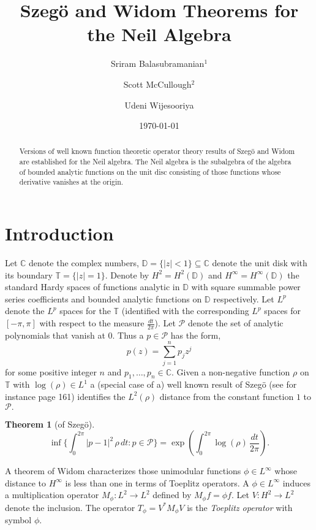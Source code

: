 \documentclass[12pt]{amsart}
\title[The Neil Algebra]{Szeg\"o and Widom Theorems for the Neil Algebra}
\author[S. Balasubramanian]{Sriram Balasubramanian${}^1$}
\author[S. McCullough]{Scott McCullough${}^2$}
\author[U. Wijesooriya]{Udeni Wijesooriya}
\date{\today}
\newtheorem{theorem}{Theorem}[section]
\theoremstyle{definition}
\theoremstyle{remark}
\numberwithin{equation}{section}
\begin{document}
\begin{abstract}
Versions of well known function theoretic operator theory results of Szeg\"o and Widom are established for the Neil algebra. The Neil algebra is the subalgebra
of the algebra of bounded analytic functions on the unit disc consisting of those functions whose derivative vanishes at the origin.
\end{abstract}

\maketitle

\section{Introduction}
      
Let ${\mathbb C}$ denote the complex numbers,  ${\mathbb D}=\{|z|<1\}{\subseteq} {\mathbb C}$ denote the unit disk with its boundary ${\mathbb T} =\{|z|=1\}$. 
Denote by  $H^2=H^2({\mathbb D})$ and $H^\infty=H^\infty({\mathbb D})$  the standard Hardy
spaces of functions analytic in $\mathbb D$ with square summable power series coefficients and bounded analytic functions on ${\mathbb D}$ respectively.
Let $L^p$ denote the $L^p$ spaces for the ${\mathbb T}$ (identified with the corresponding $L^p$ spaces for $[-\pi,\pi]$ with respect to the measure ${\frac{dt}{2\pi}}$). Let $\mathscr{P}$ denote the set of analytic polynomials that vanish at $0$.
Thus a $p\in \mathscr{P}$ has the form,
\[
  p(z) =\sum_{j=1}^n p_j z^j
\] 
for some positive integer $n$ and $p_1,\dots,p_n\in {\mathbb C}$.  Given a non-negative function ${\rho}$ on ${\mathbb T}$ with $\log({\rho})\in L^1$ 
a (special case of a) well known result of Szeg\"o (see for instance \cite{Koosis} page 161) identifies the $L^2({\rho})$ distance from the constant function $1$ to $\mathscr{P}.$

\begin{theorem}[of Szeg\"o]
\label{thm:therealszego}
 \[\inf \{ {\int_{0}^{2\pi}} |p-1|^2 \, {\rho} \, dt: p\in \mathscr{P}\} =\exp({\int_{0}^{2\pi}} \log({\rho})\, {\frac{dt}{2\pi}}).\]
\end{theorem}

A theorem of Widom  characterizes those unimodular functions $\phi \in L^\infty$ whose distance to $H^\infty$ is less than one in terms of Toeplitz operators. A $\phi\in L^\infty$ induces a multiplication operator $M_\phi:L^2\to L^2$ defined by $M_\phi f =\phi f.$ 
Let $V:H^2\to L^2$ denote the inclusion. The operator $T_\phi = V^* M_\phi V$ is the {{\it{{Toeplitz operator}}}{}} with symbol $\phi$.
 
\end{document}
